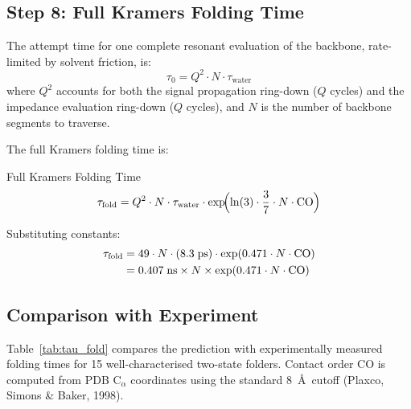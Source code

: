 \subsection{Step 8: Full Kramers Folding Time}
\label{sec:kramers_fold}

The attempt time for one complete resonant evaluation of the backbone, rate-limited by solvent friction, is:
\begin{equation}
    \tau_0 = Q^2 \cdot N \cdot \tau_\text{water}
    \label{eq:tau_attempt}
\end{equation}
where $Q^2$ accounts for both the signal propagation ring-down ($Q$ cycles) and the impedance evaluation ring-down ($Q$ cycles), and $N$ is the number of backbone segments to traverse.

The full Kramers folding time is:
\begin{resultbox}{Full Kramers Folding Time}
\begin{equation}
    \tau_\text{fold} = Q^2 \cdot N \cdot \tau_\text{water} \cdot \exp\!\Bigl(\ln(3) \cdot \frac{3}{7} \cdot N \cdot \text{CO}\Bigr)
    \label{eq:tau_fold}
\end{equation}
\end{resultbox}
Substituting constants:
\begin{align}
    \tau_\text{fold} &= 49 \cdot N \cdot (8.3\;\text{ps}) \cdot \exp(0.471 \cdot N \cdot \text{CO}) \notag \\
    &= 0.407\;\text{ns} \times N \times \exp(0.471 \cdot N \cdot \text{CO})
    \label{eq:tau_fold_num}
\end{align}

\subsection{Comparison with Experiment}
\label{sec:tau_comparison}

Table~\ref{tab:tau_fold} compares the prediction with experimentally measured folding times for 15 well-characterised two-state folders.
Contact order CO is computed from PDB C$_\alpha$ coordinates using the standard 8~\AA\ cutoff (Plaxco, Simons \& Baker, 1998).

